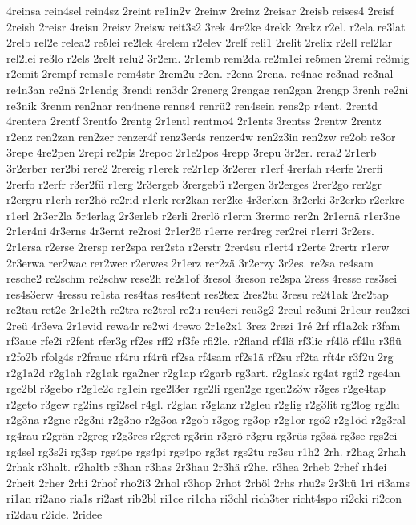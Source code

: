 {4reinsa
rein4sel
rein4sz
2reint
re1in2v
2reinw
2reinz
2reisar
2reisb
reises4
2reisf
2reish
2reisr
4reisu
2reisv
2reisw
reit3s2
3rek
4re2ke
4rekk
2rekz
r2el.
r2ela
re3lat
2relb
rel2e
relea2
re5lei
re2lek
4relem
r2elev
2relf
reli1
2relit
2relix
r2ell
rel2lar
rel2lei
re3lo
r2els
2relt
relu2
3r2em.
2r1emb
rem2da
re2m1ei
re5men
2remi
re3mig
r2emit
2rempf
rems1c
rem4str
2rem2u
r2en.
r2ena
2rena.
re4nac
re3nad
re3nal
re4n3an
re2nä
2r1endg
3rendi
ren3dr
2renerg
2rengag
ren2gan
2rengp
3renh
re2ni
re3nik
3renm
ren2nar
ren4nene
renns4
renrü2
ren4sein
rens2p
r4ent.
2rentd
4rentera
2rentf
3rentfo
2rentg
2r1entl
rentmo4
2r1ents
3rentss
2rentw
2rentz
r2enz
ren2zan
ren2zer
renzer4f
renz3er4s
renzer4w
ren2z3in
ren2zw
re2ob
re3or
3repe
4re2pen
2repi
re2pis
2repoc
2r1e2pos
4repp
3repu
3r2er.
rera2
2r1erb
3r2erber
rer2bi
rere2
2rereig
r1erek
re2r1ep
3r2erer
r1erf
4rerfah
r4erfe
2rerfi
2rerfo
r2erfr
r3er2fü
r1erg
2r3ergeb
3rergebü
r2ergen
3r2erges
2rer2go
rer2gr
r2ergru
r1erh
rer2hö
re2rid
r1erk
rer2kan
rer2ke
4r3erken
3r2erki
3r2erko
r2erkre
r1erl
2r3er2la
5r4erlag
2r3erleb
r2erli
2rerlö
r1erm
3rermo
rer2n
2r1ernä
r1er3ne
2r1er4ni
4r3erns
4r3ernt
re2rosi
2r1er2ö
r1erre
rer4reg
rer2rei
r1erri
3r2ers.
2r1ersa
r2erse
2rersp
rer2spa
rer2sta
r2erstr
2rer4su
r1ert4
r2erte
2rertr
r1erw
2r3erwa
rer2wac
rer2wec
r2erwes
2r1erz
rer2zä
3r2erzy
3r2es.
re2sa
re4sam
resche2
re2schm
re2schw
rese2h
re2s1of
3resol
3reson
re2spa
2ress
4resse
res3sei
res4s3erw
4ressu
re1sta
res4tas
res4tent
res2tex
2res2tu
3resu
re2t1ak
2re2tap
re2tau
ret2e
2r1e2th
re2tra
re2trol
re2u
reu4eri
reu3g2
2reul
re3uni
2r1eur
reu2zei
2reü
4r3eva
2r1evid
rewa4r
re2wi
4rewo
2r1e2x1
3rez
2rezi
1ré
2rf
rf1a2ck
r3fam
rf3aue
rfe2i
r2fent
rfer3g
rf2es
rff2
rf3fe
rfi2le.
r2fland
rf4lä
rf3lic
rf4lö
rf4lu
r3flü
r2fo2b
rfolg4s
r2frauc
rf4ru
rf4rü
rf2sa
rf4sam
rf2s1ä
rf2su
rf2ta
rft4r
r3f2u
2rg
r2g1a2d
r2g1ah
r2g1ak
rga2ner
r2g1ap
r2garb
rg3art.
r2g1ask
rg4at
rgd2
rge4an
rge2bl
r3gebo
r2g1e2c
rg1ein
rge2l3er
rge2li
rgen2ge
rgen2z3w
r3ges
r2ge4tap
r2geto
r3gew
rg2ins
rgi2sel
r4gl.
r2glan
r3glanz
r2gleu
r2glig
r2g3lit
rg2log
rg2lu
r2g3na
r2gne
r2g3ni
r2g3no
r2g3oa
r2gob
r3gog
rg3op
r2g1or
rgö2
r2g1öd
r2g3ral
rg4rau
r2grän
r2greg
r2g3res
r2gret
rg3rin
r3grö
r3gru
rg3rüs
rg3sä
rg3se
rgs2ei
rg4sel
rg3s2i
rg3sp
rgs4pe
rgs4pi
rgs4po
rg3st
rgs2tu
rg3su
r1h2
2rh.
r2hag
2rhah
2rhak
r3halt.
r2haltb
r3han
r3has
2r3hau
2r3hä
r2he.
r3hea
2rheb
2rhef
rh4ei
2rheit
2rher
2rhi
2rhof
rho2i3
2rhol
r3hop
2rhot
2rhöl
2rhs
rhu2s
2r3hü
1ri
ri3ams
ri1an
ri2ano
ria1s
ri2ast
rib2bl
ri1ce
ri1cha
ri3chl
rich3ter
richt4spo
ri2cki
ri2con
ri2dau
r2ide.
2ridee
}
